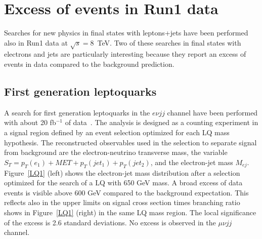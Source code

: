 \documentclass[epj]{webofc}
\begin{document}
\section{Excess of events in Run1 data}
\label{excess}

Searches for new physics in final states with leptons+jets have been
performed also in Run1 data at $\sqrt{s}=8$~TeV. Two of these searches
in final states with electrons and jets are particularly interesting
because they report an excess of events in data compared to
the background prediction.

\subsection{First generation leptoquarks}

A search for first generation leptoquarks in the $e\nu jj$ channel
have been performed with about 20 fb$^{-1}$ of data~\cite{Khachatryan:2015vaa}. The analysis is
designed as a counting experiment in a signal region defined by an
event selection optimized for each LQ mass hypothesis. The
reconstructed observables used in the selection to separate signal from background
are the electron-neutrino transverse mass, the variable $S_{T}=p_T(e_1)+MET+p_T(jet_1)+p_T(jet_2)$, 
and the electron-jet mass $M_{ej}$. Figure~\ref{LQ1} (left) shows the 
electron-jet mass distribution after a selection optimized for the
search of a LQ with 650 GeV mass. A broad excess of data events is visible 
above 600 GeV compared to the background expectation. This reflects also in the
upper limits on signal cross section times branching ratio shows in
Figure~\ref{LQ1} (right) in the same LQ mass region. The local significance of
the excess is 2.6 standard deviations. No excess is observed in the
$\mu\nu jj$ channel.
%
\end{document}
